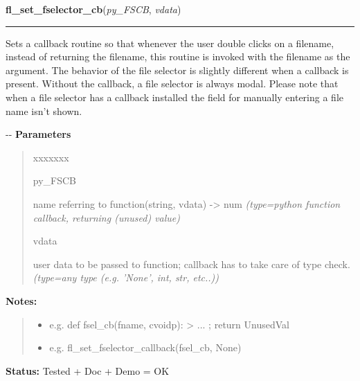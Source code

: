     \label{xformslib:flgoodies:fl_set_fselector_callback}

    \vspace{0.5ex}

\hspace{.8\funcindent}\begin{boxedminipage}{\funcwidth}

    \raggedright \textbf{fl\_set\_fselector\_cb}(\textit{py\_FSCB}, \textit{vdata})

    \vspace{-1.5ex}

    \rule{\textwidth}{0.5\fboxrule}
\setlength{\parskip}{2ex}

Sets a callback routine so that whenever the user double clicks on a
filename, instead of returning the filename, this routine is invoked with
the filename as the argument. The behavior of the file selector is
slightly different when a callback is present. Without the callback, a
file selector is always modal. Please note that when a file selector has
a callback installed the field for manually entering a file name isn't
shown.

-{}-
\setlength{\parskip}{1ex}
      \textbf{Parameters}
      \vspace{-1ex}

      \begin{quote}
        \begin{Ventry}{xxxxxxx}

          \item[py\_FSCB]


name referring to function(string, vdata) -> num
            {\it (type=python function callback, returning (unused) value)}

          \item[vdata]


user data to be passed to function; callback has to take care of
type check.
            {\it (type=any type (e.g. 'None', int, str, etc..))}

        \end{Ventry}

      \end{quote}

\textbf{Notes:}
\begin{quote}
  \begin{itemize}

  \item
    \setlength{\parskip}{0.6ex}

e.g. def fsel\_cb(fname, cvoidp): > ... ; return UnusedVal


  \item 
e.g. fl\_set\_fselector\_callback(fsel\_cb, None)


\end{itemize}

\end{quote}

\textbf{Status:} 
Tested + Doc + Demo = OK


    \end{boxedminipage}

